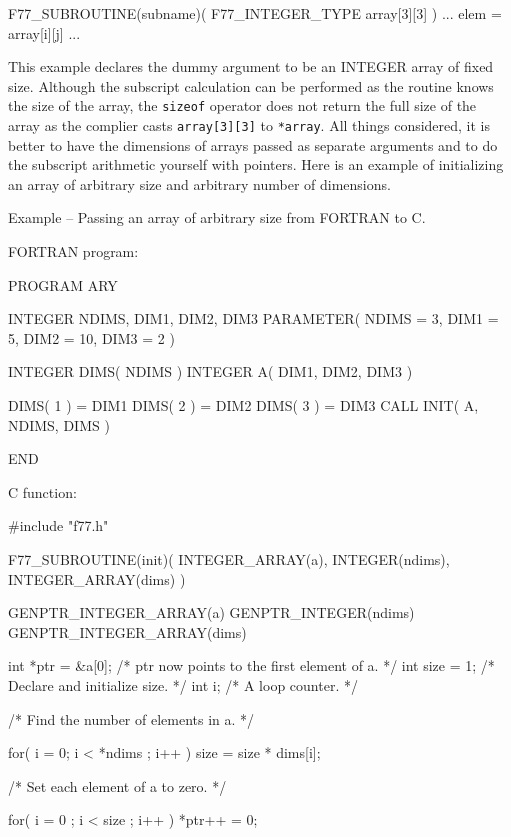 \documentclass[twoside,11pt,nolof]{starlink}
\newcounter{examples}
\begin{document}
\begin{small}
\begin{terminalv}
F77_SUBROUTINE(subname)( F77_INTEGER_TYPE array[3][3] )
{
  ...
  elem = array[i][j]
  ...
}
\end{terminalv}
\end{small}

This example declares the dummy argument to be an INTEGER array of fixed size.
Although the subscript calculation can be performed as the routine knows the
size of the array, the \texttt{sizeof} operator does not return the full size of
the array as the complier casts \texttt{array[3][3]} to \texttt{*array}. All
things considered, it is better to have the dimensions of arrays passed as
separate arguments and to do the subscript arithmetic yourself with pointers.
Here is an example of initializing an array of arbitrary size and arbitrary
number of dimensions.
\newpage
{}
\label{f77_arbary}
\begin{center}
Example\latex{~\ref{f77_arbary}}
-- Passing an array of arbitrary size from FORTRAN
to C\@.
\end{center}
\nopagebreak[4]
FORTRAN program:
\nopagebreak[4]
\begin{small}
\begin{terminalv}
      PROGRAM ARY

      INTEGER NDIMS, DIM1, DIM2, DIM3
      PARAMETER( NDIMS = 3, DIM1 = 5, DIM2 = 10, DIM3 = 2 )

      INTEGER DIMS( NDIMS )
      INTEGER A( DIM1, DIM2, DIM3 )

      DIMS( 1 ) = DIM1
      DIMS( 2 ) = DIM2
      DIMS( 3 ) = DIM3
      CALL INIT( A, NDIMS, DIMS )

      END
\end{terminalv}
\end{small}
\pagebreak[1]
C function:
\nopagebreak[4]
\begin{small}
\begin{terminalv}
#include "f77.h"

F77_SUBROUTINE(init)( INTEGER_ARRAY(a), INTEGER(ndims), INTEGER_ARRAY(dims) )
{
  GENPTR_INTEGER_ARRAY(a)
  GENPTR_INTEGER(ndims)
  GENPTR_INTEGER_ARRAY(dims)

  int *ptr = &a[0];  /* ptr now points to the first element of a.  */
  int size = 1;      /* Declare and initialize size.  */
  int i;             /* A loop counter.  */

  /* Find the number of elements in a.  */

  for( i = 0; i < *ndims ; i++ )
     size = size * dims[i];

  /* Set each element of a to zero.  */

  for( i = 0 ; i < size ; i++ )
     *ptr++ = 0;
}
\end{terminalv}
\end{small}
\end{document}
